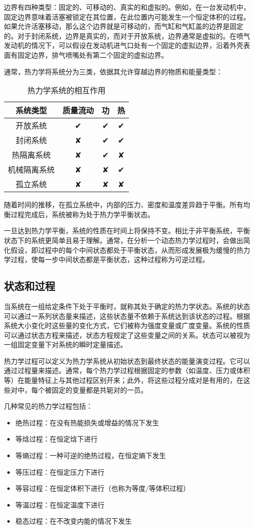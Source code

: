 边界有四种类型：固定的、可移动的、真实的和虚拟的。例如，在一台发动机中，固定边界意味着活塞被锁定在其位置，在此位置内可能发生一个恒定体积的过程。如果允许活塞移动，那么这个边界就是可移动的，而气缸和气缸盖的边界是固定的。对于封闭系统，边界是真实的，而对于开放系统，边界通常是虚拟的。在喷气发动机的情况下，可以假设在发动机进气口处有一个固定的虚拟边界，沿着外壳表面有固定边界，排气喷嘴处有第二个固定的虚拟边界。

通常，热力学将系统分为三类，依据其允许穿越边界的物质和能量类型：
\begin{table}[ht]
\centering
\caption{热力学系统的相互作用}\label{RLX}
\begin{tabular}{|c|c|c|c|}
\hline
\textbf{系统类型} & \textbf{质量流动} & \textbf{功} & \textbf{热} \\
\hline
开放系统 & ✔ & ✔ & ✔ \\
\hline
封闭系统 & ✘ & ✔& ✔ \\
\hline
热隔离系统 & ✘ & ✔& ✘\\
\hline
机械隔离系统 & ✘ & ✘& ✔\\
\hline
孤立系统 & ✘ & ✘& ✘\\ 
\hline
\end{tabular}
\end{table}
随着时间的推移，在孤立系统中，内部的压力、密度和温度差异趋于平衡。所有均衡过程完成后，系统被称为处于热力学平衡状态。

一旦达到热力学平衡，系统的性质在时间上将保持不变。相比于非平衡系统，平衡状态下的系统更简单且易于理解。通常，在分析一个动态热力学过程时，会做出简化假设，即过程中的每个中间状态都处于平衡状态，从而形成发展极为缓慢的热力学过程，使每一步中间状态都是平衡状态，这种过程称为可逆过程。
\subsection{状态和过程} 
当系统在一组给定条件下处于平衡时，就称其处于确定的热力学状态。系统的状态可以通过一系列状态量来描述，这些状态量不依赖于系统达到该状态的过程。根据系统大小变化时这些量的变化方式，它们被称为强度变量或广度变量。系统的性质可以通过状态方程来描述，状态方程规定了这些变量之间的关系。状态可以被视为一组固定变量下对系统的瞬时定量描述。

热力学过程可以定义为热力学系统从初始状态到最终状态的能量演变过程。它可以通过过程量来描述。通常，每个热力学过程根据固定的参数（如温度、压力或体积等）在能量特征上与其他过程区别开来；此外，将这些过程分成对是有用的，在这些对中，每个被固定的变量都是共轭对的一员。

几种常见的热力学过程包括：
\begin{itemize}
\item 绝热过程：在没有热能损失或增益的情况下发生
\item 等焓过程：在恒定焓下进行
\item 等熵过程：一种可逆的绝热过程，在恒定熵下发生
\item 等压过程：在恒定压力下进行
\item 等容过程：在恒定体积下进行（也称为等度/等体积过程）
\item 等温过程：在恒定温度下进行
\item 稳态过程：在不改变内能的情况下发生
\end{itemize}
